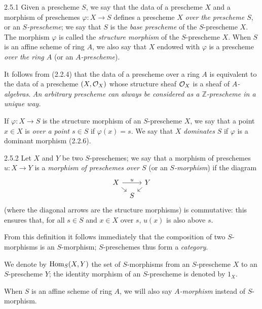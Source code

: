 \documentclass[../main.tex]{subfiles}
\begin{document}
\begin{env}[Definition]{2.5.1}
    Given a prescheme $S$, we say that the data of a prescheme $X$ and a morphism of preschemes $\varphi\colon X\to S$ defines a prescheme $X$ \emph{over the prescheme $S$}, or an \emph{$S$-prescheme}; we say that $S$ is the \emph{base prescheme} of the $S$-prescheme $X$.
    The morphism $\varphi$ is called the \emph{structure morphism} of the $S$-prescheme $X$.
    When $S$ is an affine scheme of ring $A$, we also say that $X$ endowed with $\varphi$ is a prescheme \emph{over the ring $A$} (or an \emph{$A$-prescheme}).
\end{env}

It follows from (2.2.4) that the data of a prescheme over a ring $A$ is equivalent to the data of a prescheme $(X,\mathcal{O}_X)$ whose structure sheaf $\mathcal{O}_X$ is a sheaf of \emph{$A$-algebras}.
\emph{An arbitrary prescheme can always be considered as a $\mathbb{Z}$-prescheme in a unique way.}

If $\varphi\colon X\to S$ is the structure morphism of an $S$-prescheme $X$, we say that a point $x\in X$ is \emph{over a point $s\in S$} if $\varphi(x)=s$.
We say that $X$ \emph{dominates} $S$ if $\varphi$ is a dominant morphism (2.2.6).

\begin{env}{2.5.2}
    Let $X$ and $Y$ be two $S$-preschemes; we say that a morphism of preschemes $u\colon X\to Y$ is a \emph{morphism of preschemes over $S$} (or an \emph{$S$-morphism}) if the diagram
    \begin{equation*}
        \begin{tikzcd}[column sep=tiny, row sep=tiny]
            X \arrow[rr,"u"] \arrow[dr] & & Y \arrow[dl]\\
            & S &
        \end{tikzcd}
    \end{equation*}
    (where the diagonal arrows are the structure morphisms) is commutative: this ensures that, for all $s\in S$ and $x\in X$ over $s$, $u(x)$ is also above $s$.
\end{env}

From this definition it follows immediately that the composition of two $S$-morphisms is an $S$-morphism; $S$-preschemes thus form a \emph{category}.

We denote by $\operatorname{Hom}_S(X,Y)$ the set of $S$-morphisms from an $S$-prescheme $X$ to an $S$-prescheme $Y$; the identity morphism of an $S$-prescheme is denoted by $1_X$.

When $S$ is an affine scheme of ring $A$, we will also say \emph{$A$-morphism} instead of $S$-morphism.
\end{document}
